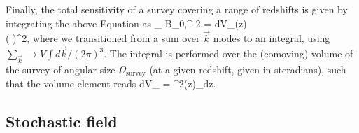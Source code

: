Finally, the total sensitivity of a survey covering a range of redshifts is given by integrating the above Equation as
\beq
\bga
\sigma_{ B_0,}^{-2} = 
\int dV_\mathrm{}(z)
\\
\times\left(  \right)^2,
\ega
\label{eq:fisher_patch}
\eeq
where we transitioned from a sum over $\vec k$ modes to an integral, using $\sum_{\vec k} \to V\int d\vec k /(2\pi)^3$. 
The integral is performed over the (comoving) volume of the survey of angular size $\Omega_\mathrm{survey}$ (at a given redshift, given in steradians), such that the volume element reads
\beq
dV_\mathrm{} = \chi^2(z)\Omega_dz.
\label{eq:dVpatch}
\eeq

\subsection{Stochastic field}
\label{subsec:SI}

